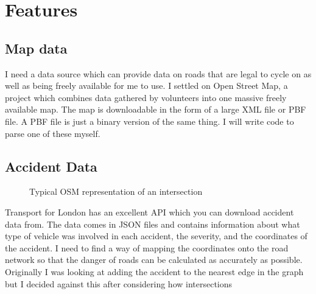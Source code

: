\documentclass[11pt,twoside,a4paper]{report}
\begin{document}
\section{Features}
\subsection{Map data}
I need a data source which can provide data on roads that are legal to cycle on as well as being freely available for me to use. I settled on Open Street Map, a project which combines data gathered by volunteers into one massive freely available map. The map is downloadable in the form of a large XML file or PBF file. A PBF file is just a binary version of the same thing. I will write code to parse one of these myself.

\subsection{Accident Data}
\begin{figure}
    \begin{center}
\end{center}
    \caption{Typical OSM representation of an intersection}
    \label{intersection}
\end{figure}
Transport for London has an excellent API which you can download accident data from. The data comes in JSON files and contains information about what type of vehicle was involved in each accident, the severity, and the coordinates of the accident. 
I need to find a way of mapping the coordinates onto the road network so that the danger of roads can be calculated as accurately as possible. Originally I was looking at adding the accident to the nearest edge in the graph but I decided against this after considering how intersections 
\end{document}
